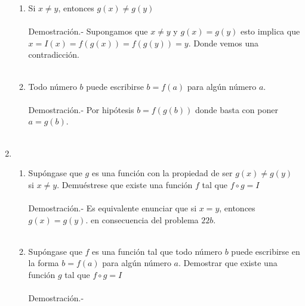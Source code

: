 \begin{enumerate}
	\begin{enumerate}[\bfseries (a)]

	    \item Si $x\neq y$, entonces $g(x)\neq g(y)$\\\\
		Demostración.-\; Supongamos que $x\neq y$ y $g(x)=g(y)$ esto implica que $x=I(x)=f(g(x))=f(g(y))=y$. Donde vemos una contradicción.\\\\

	    \item Todo número $b$ puede escribirse $b=f(a)$ para algún número $a$.\\\\
		Demostración.-\; Por hipótesis $b=f(g(b))$ donde basta con poner $a=g(b)$.\\\\

	\end{enumerate}

	\item 
	
	\begin{enumerate}[\bfseries (a)]

	    \item Supóngase que $g$ es una función con la propiedad de ser $g(x)\neq g(y)$ si $x\neq y$. Demuéstrese que existe una función $f$ tal que $f\circ g = I$\\\\
		Demostración.-\; Es equivalente enunciar que si $x=y$, entonces $g(x)=g(y)$. en consecuencia del problema $22b$.\\\\

	    \item Supóngase que $f$ es una función tal que todo número $b$ puede escribirse en la forma $b=f(a)$ para algún número $a$. Demostrar que existe una función $g$ tal que $f\circ g=I$\\\\
		Demostración.-\; 

	\end{enumerate}

    \end{enumerate}
